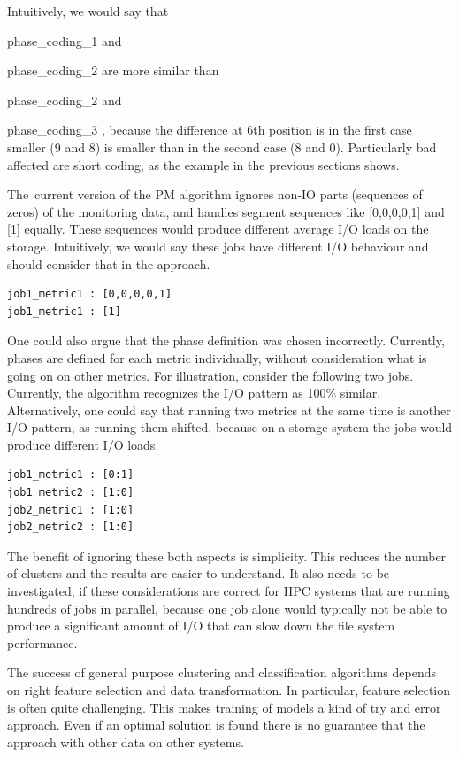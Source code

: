 \documentclass[]{llncs}
\begin{document}
Intuitively, we would say that {phase\_coding\_1 and{ phase\_coding\_2 are more similar than {phase\_coding\_2 and {phase\_coding\_3 , because the difference at 6th position is in the first case smaller (9 and 8) is smaller than in the second case (8 and 0).
Particularly bad affected are short coding, as the example in the previous sections shows.

The\ current version of the PM algorithm ignores non-IO parts (sequences of zeros) of the monitoring data, and  handles segment sequences like [0,0,0,0,1] and [1] equally.
These sequences would produce different average I/O loads on the storage.
Intuitively, we would say these jobs have different I/O behaviour and should consider that in the approach.


\begin{lstlisting}
job1_metric1 : [0,0,0,0,1]
job1_metric1 : [1]
\end{lstlisting}


One could also argue that the phase definition was chosen incorrectly.
Currently, phases are defined for each metric individually, without consideration what is going on on other metrics.
For illustration, consider the following two jobs.
Currently, the algorithm recognizes the I/O pattern as 100$\%$  similar.
Alternatively, one could say that running two metrics at the same time is another I/O pattern, as running them shifted, because on a storage system the jobs would produce different I/O loads.

\begin{lstlisting}
job1_metric1 : [0:1]
job1_metric2 : [1:0]
job2_metric1 : [1:0]
job2_metric2 : [1:0]
\end{lstlisting}

The benefit of ignoring these both aspects is simplicity.
This reduces the number of clusters and the results are easier to understand.
It also needs to be investigated, if these considerations are correct for HPC systems that are running hundreds of jobs in parallel, because one job alone would typically not be able to produce a significant amount of I/O that can slow down the file system performance.

The success of general purpose clustering and classification algorithms depends on right feature selection and data transformation.
In particular, feature selection is often quite challenging.
This makes training of models a kind of try and error approach.
Even if an optimal solution is found there is no guarantee that the approach with other data on other systems.

}}}}
\end{document}
